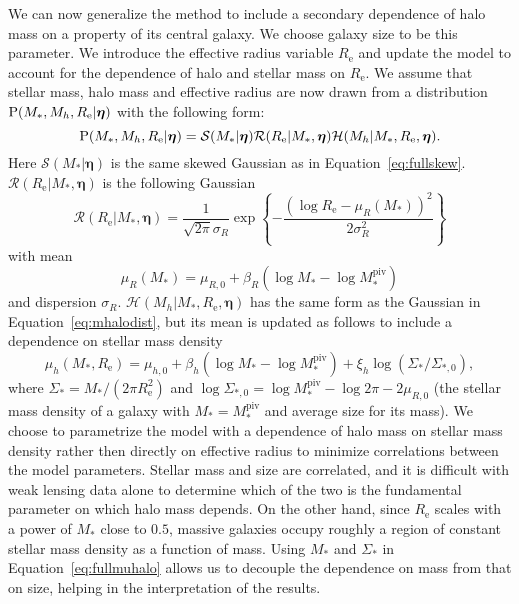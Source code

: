 \documentclass[usenatbib]{mnras}
\def\mstar{M_*}
\def\mpiv{M_*^{\mathrm{piv}}}
\def\mhalo{M_{h}}
\def\reff{R_{\mathrm{e}}}
\def\sigmar{\sigma_{R}}
\def\hyperp{\boldsymbol{\eta}}
\def\Eref#1{Equation~\ref{#1}\xspace}
\def\pr{{\rm P}}
\begin{document}
We can now generalize the method to include a secondary dependence of halo mass on a property of its central galaxy. We choose galaxy size to be this parameter.
We introduce the effective radius variable $\reff$ and update the model to account for the dependence of halo and stellar mass on $\reff$.
We assume that stellar mass, halo mass and effective radius are now drawn from a distribution $\pr(\mstar, \mhalo, \reff | \hyperp)$ with the following form:
\begin{equation}
\pr(\mstar, \mhalo, \reff | \hyperp) = \mathcal{S}(\mstar | \hyperp) \mathcal{R}(\reff | \mstar, \hyperp) \mathcal{H}(\mhalo | \mstar, \reff, \hyperp).
\end{equation}
Here $\mathcal{S}(\mstar | \hyperp)$ is the same skewed Gaussian as in \Eref{eq:fullskew}. $\mathcal{R}(\reff | \mstar, \hyperp)$ is the following Gaussian
\begin{equation}\label{eq:reterm}
\mathcal{R}(\reff | \mstar, \hyperp) = \frac{1}{\sqrt{2\pi}\sigmar}\exp{\left\{-\frac{(\log{\reff} - \mu_R(\mstar))^2}{2\sigmar^2}\right\}}
\end{equation}
with mean
\begin{equation}\label{eq:remu}
\mu_R(\mstar) = \mu_{R, 0} + \beta_R(\log{\mstar} - \log{\mpiv})
\end{equation}
and dispersion $\sigmar$. $\mathcal{H}(\mhalo | \mstar, \reff, \hyperp)$ has the same form as the Gaussian in \Eref{eq:mhalodist}, but its mean is updated as follows to include a dependence on stellar mass density
\begin{equation}\label{eq:fullmuhalo}
\mu_h(\mstar, \reff) = \mu_{h,0} + \beta_h(\log{\mstar} - \log{\mpiv}) + \xi_h\log{(\Sigma_*/\Sigma_{*,0})},
\end{equation}
where $\Sigma_* = \mstar/(2\pi\reff^2)$ and $\log{\Sigma_{*,0}}= \log{\mpiv} - \log{2\pi} - 2\mu_{R,0}$ (the stellar mass density of a galaxy with $\mstar=\mpiv$ and average size for its mass).
We choose to parametrize the model with a dependence of halo mass on stellar mass density rather then directly on effective radius to minimize correlations between the model parameters. Stellar mass and size are correlated, and it is difficult with weak lensing data alone to determine which of the two is the fundamental parameter on which halo mass depends. On the other hand, since $\reff$ scales with a power of $\mstar$ close to $0.5$, massive galaxies occupy roughly a region of constant stellar mass density as a function of mass. Using $\mstar$ and $\Sigma_*$ in \Eref{eq:fullmuhalo} allows us to decouple the dependence on mass from that on size, helping in the interpretation of the results.
\end{document}
